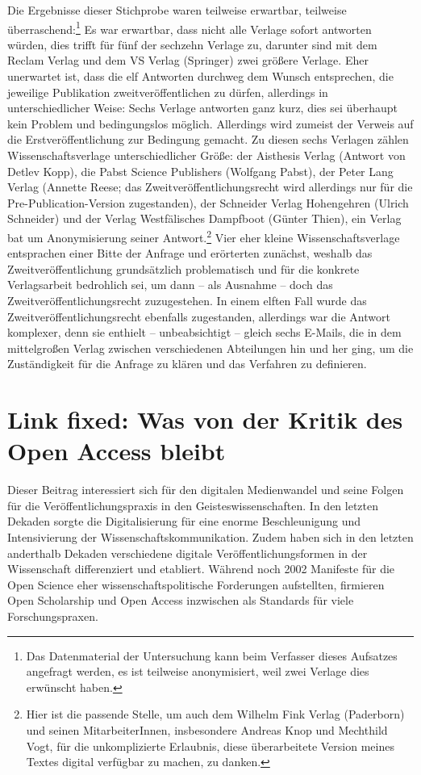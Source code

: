 \documentclass[a4paper,
fontsize=11pt,
oneside,
numbers=noperiodatend,
parskip=half-,
bibliography=totoc,
final
]{scrartcl}
\begin{document}
Die Ergebnisse dieser Stichprobe waren teilweise erwartbar, teilweise
überraschend:\footnote{Das Datenmaterial der Untersuchung kann beim
  Verfasser dieses Aufsatzes angefragt werden, es ist teilweise
  anonymisiert, weil zwei Verlage dies erwünscht haben.} Es war
erwartbar, dass nicht alle Verlage sofort antworten würden, dies trifft
für fünf der sechzehn Verlage zu, darunter sind mit dem Reclam Verlag
und dem VS Verlag (Springer) zwei größere Verlage. Eher unerwartet ist,
dass die elf Antworten durchweg dem Wunsch entsprechen, die jeweilige
Publikation zweitveröffentlichen zu dürfen, allerdings in
unterschiedlicher Weise: Sechs Verlage antworten ganz kurz, dies sei
überhaupt kein Problem und bedingungslos möglich. Allerdings wird
zumeist der Verweis auf die Erstveröffentlichung zur Bedingung gemacht.
Zu diesen sechs Verlagen zählen Wissenschaftsverlage unterschiedlicher
Größe: der Aisthesis Verlag (Antwort von Detlev Kopp), die Pabst Science
Publishers (Wolfgang Pabst), der Peter Lang Verlag (Annette Reese; das
Zweitveröffentlichungsrecht wird allerdings nur für die
Pre-Publication-Version zugestanden), der Schneider Verlag Hohengehren
(Ulrich Schneider) und der Verlag Westfälisches Dampfboot (Günter
Thien), ein Verlag bat um Anonymisierung seiner Antwort.\footnote{Hier
  ist die passende Stelle, um auch dem Wilhelm Fink Verlag (Paderborn)
  und seinen MitarbeiterInnen, insbesondere Andreas Knop und Mechthild
  Vogt, für die unkomplizierte Erlaubnis, diese überarbeitete Version
  meines Textes digital verfügbar zu machen, zu danken.} Vier eher
kleine Wissenschaftsverlage entsprachen einer Bitte der Anfrage und
erörterten zunächst, weshalb das Zweitveröffentlichung grundsätzlich
problematisch und für die konkrete Verlagsarbeit bedrohlich sei, um dann
-- als Ausnahme -- doch das Zweitveröffentlichungsrecht zuzugestehen. In
einem elften Fall wurde das Zweitveröffentlichungsrecht ebenfalls
zugestanden, allerdings war die Antwort komplexer, denn sie enthielt --
unbeabsichtigt -- gleich sechs E-Mails, die in dem mittelgroßen Verlag
zwischen verschiedenen Abteilungen hin und her ging, um die
Zuständigkeit für die Anfrage zu klären und das Verfahren zu definieren.

\section*{Link fixed: Was von der Kritik des Open Access
bleibt}\label{link-fixed-was-von-der-kritik-des-open-access-bleibt}

Dieser Beitrag interessiert sich für den digitalen Medienwandel und
seine Folgen für die Veröffentlichungspraxis in den
Geisteswissenschaften. In den letzten Dekaden sorgte die Digitalisierung
für eine enorme Beschleunigung und Intensivierung der
Wissenschaftskommunikation. Zudem haben sich in den letzten anderthalb
Dekaden verschiedene digitale Veröffentlichungsformen in der
Wissenschaft differenziert und etabliert. Während noch 2002 Manifeste
für die Open Science eher wissenschaftspolitische Forderungen
aufstellten, firmieren Open Scholarship und Open Access inzwischen als
Standards für viele Forschungspraxen.
\end{document}
